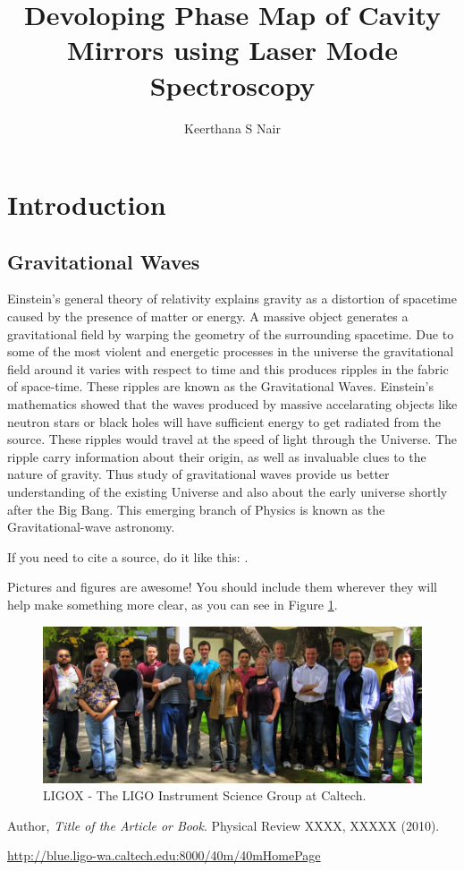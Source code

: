 \documentclass[colorlinks=true,pdfstartview=FitV,linkcolor=blue,
            citecolor=red,urlcolor=magenta]{ligodoc}
\title{Devoloping Phase Map of Cavity Mirrors using Laser Mode Spectroscopy }
\author{Keerthana S Nair
\newline{Mentors: Gautam Venugopal, Koji Arai and Rana Adhikari}}
\begin{document}
\section{Introduction} 
\subsection{Gravitational Waves}
Einstein's general theory of relativity explains gravity as a distortion of spacetime caused by the presence of matter or energy. A massive object generates a gravitational field by warping the geometry of the surrounding spacetime. Due to some of the most violent and energetic processes in the universe the gravitational field around it varies with respect to time and this produces ripples in the fabric of space-time. These ripples are known as the Gravitational Waves. Einstein's mathematics showed that the waves produced by massive accelarating objects like neutron stars or black holes will have sufficient energy to get radiated from the source. These ripples would travel at the speed of light through the Universe. The ripple carry information about their origin, as well as invaluable clues to the nature of gravity. Thus study of gravitational waves provide us better understanding of the existing Universe and also about the early universe shortly after the Big Bang. This emerging branch of Physics is known as the Gravitational-wave astronomy.

If you need to cite a source, do it like this: \cite{CitationKeyWord}.

Pictures and figures are awesome!  You should include them wherever
they will help make something more clear, as you can see in Figure \ref{fig:FigureKeyWord}.

 \begin{figure}[htbp]
\begin{center}
\includegraphics[width=6in]{LIGOX_29March2011.jpg}
\caption{LIGOX - The LIGO Instrument Science Group at Caltech.}
\label{fig:FigureKeyWord}
\end{center}
\end{figure}         


\begin{thebibliography}{9}
      
	  Author,
	  \emph{Title of the Article or Book}.
	 Physical Review XXXX, XXXXX (2010).    
      
       \url{http://blue.ligo-wa.caltech.edu:8000/40m/40mHomePage}
 
\end{thebibliography} %
\end{document}
